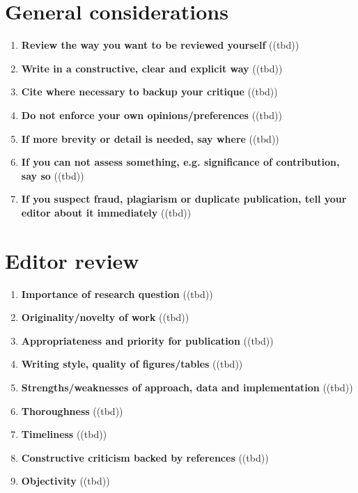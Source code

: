 \section{General considerations}\label{sec:considerations}
\begin{enumerate}[resume]
    \item \textbf{Review the way you want to be reviewed yourself} 	\textcolor{HighlightColor}{((tbd))}
    \item \textbf{Write in a constructive, clear and explicit way} 	\textcolor{HighlightColor}{((tbd))}
    \item \textbf{Cite where necessary to backup your critique} 	\textcolor{HighlightColor}{((tbd))}
    \item \textbf{Do not enforce your own opinions/preferences} 	\textcolor{HighlightColor}{((tbd))}
    \item \textbf{If more brevity or detail is needed, say where} 	\textcolor{HighlightColor}{((tbd))}
    \item \textbf{If you can not assess something, e.g. significance of contribution, say so} 	\textcolor{HighlightColor}{((tbd))}
    \item \textbf{If you suspect fraud, plagiarism or duplicate publication, tell your editor about it immediately} 	\textcolor{HighlightColor}{((tbd))}
\end{enumerate}

\section{Editor review}\label{sec:editorreview}
\begin{enumerate}[resume]
    \item \textbf{Importance of research question} 	\textcolor{HighlightColor}{((tbd))}
    \item \textbf{Originality/novelty of work} 	\textcolor{HighlightColor}{((tbd))}
    \item \textbf{Appropriateness and priority for publication} 	\textcolor{HighlightColor}{((tbd))}
    \item \textbf{Writing style, quality of figures/tables} 	\textcolor{HighlightColor}{((tbd))}
    \item \textbf{Strengths/weaknesses of approach, data and implementation} 	\textcolor{HighlightColor}{((tbd))}
    \item \textbf{Thoroughness} 	\textcolor{HighlightColor}{((tbd))}
    \item \textbf{Timeliness} 	\textcolor{HighlightColor}{((tbd))}
    \item \textbf{Constructive criticism backed by references} 	\textcolor{HighlightColor}{((tbd))}
    \item \textbf{Objectivity} 	\textcolor{HighlightColor}{((tbd))}
\end{enumerate}
